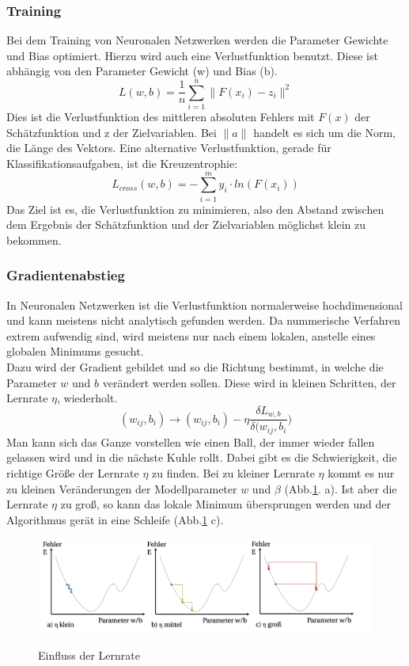 \subsubsection{Training}
Bei dem Training von Neuronalen Netzwerken werden die Parameter Gewichte und Bias optimiert.  Hierzu wird auch eine Verlustfunktion benutzt.  Diese ist abhängig von den Parameter Gewicht (w) und Bias (b). 
\begin{equation}
 L(w, b)= \frac{1}{n} \sum_{i =1}^{n} \lVert F(x_{i})-z_{i} \rVert^{2}
\end{equation}
Dies ist die Verlustfunktion des mittleren absoluten Fehlers mit $F(x)$ der Schätzfunktion und z der Zielvariablen.  Bei $\lVert a \rVert$ handelt es sich um die Norm,  die Länge des Vektors.  Eine alternative Verlustfunktion, gerade für Klassifikationsaufgaben, ist die Kreuzentrophie: \\
\begin{equation}
L_{cross}(w,b)= - \sum_{i=1}^{m} y_{i} \cdot ln(F(x_{i}))
\end{equation}
Das Ziel ist es, die Verlustfunktion zu minimieren,  also den Abstand zwischen dem Ergebnis der Schätzfunktion und der Zielvariablen möglichst klein zu bekommen.\\
\subsubsection{Gradientenabstieg} \label{Gradient}
In Neuronalen Netzwerken ist die Verlustfunktion normalerweise hochdimensional und kann meistens nicht analytisch gefunden werden.  Da nummerische Verfahren extrem aufwendig sind,  wird meistens nur nach einem lokalen,  anstelle eines globalen Minimums gesucht. \\
Dazu wird der Gradient gebildet und so die Richtung bestimmt,  in welche die Parameter $w$ und $b$ verändert werden sollen.  Diese wird in kleinen Schritten, der Lernrate $\eta$, wiederholt.
\begin{equation}
(w_{ij},b_{i}) \rightarrow (w_{ij},b_{i}) - \eta \frac{\delta L_{w ,b}}{\delta (w_{ij},b_{i}})
\end{equation}
Man kann sich das Ganze vorstellen wie einen Ball, der immer wieder fallen gelassen wird und in die nächste  Kuhle rollt.  Dabei gibt es die Schwierigkeit, die richtige Größe der Lernrate $\eta$ zu finden.  Bei zu kleiner Lernrate $\eta$ kommt es nur zu kleinen Veränderungen der Modellparameter $w$ und $\beta$ (Abb.\ref{fig: Lernrate}. a). Ist aber die Lernrate $\eta$ zu groß,  so kann das lokale Minimum übersprungen werden und  der Algorithmus gerät in eine Schleife (Abb.\ref{fig: Lernrate} c).\\
\begin{figure}[h]
\centering
\includegraphics[scale=0.6]{pic/Lernrate}
\caption{Einfluss der Lernrate}\cite{Matzka_2021}
\label {fig: Lernrate}
\end{figure}
